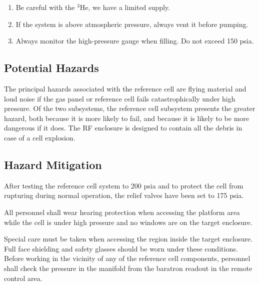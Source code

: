 {\begin{enumerate}

\item Be careful with the $^3$He, we have a limited supply.

\item If the system is above atmospheric pressure, always vent it
before pumping.  

\item Always monitor the high-pressure gauge when filling. Do not  exceed 150 psia.

\end{enumerate}

\begin{safetyen}{10}{5}

\subsection{Potential Hazards}

The principal hazards associated with the reference cell are
flying material and loud noise if the gas panel or reference cell
fails catastrophically under high pressure.  Of the two subsystems,
the reference cell subsystem presents the greater hazard, both because
it is more likely to fail, and because it is likely to be more
dangerous if it does.  The RF enclosure is designed to contain all the debris
in case of a cell explosion.


\subsection{Hazard Mitigation }

After testing the reference cell system to 200 psia and to protect the
cell from rupturing during normal operation, the relief valves have
been set to 175 psia.


All personnel shall wear hearing protection when accessing the
 platform area while the cell is under high pressure and no windows
 are on the target enclosure.

Special care must be taken when accessing the region inside the target
enclosure.  Full face shielding and safety glasses should be worn
under these conditions.  Before working in the vicinity of any of the
reference cell components, personnel shall check the pressure in the
manifold from the baratron readout in the remote control area.

\end{safetyen}

} %
